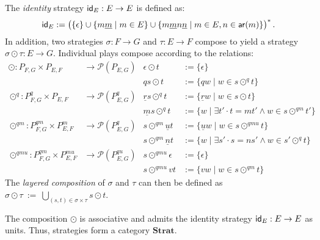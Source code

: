 \begin{definition} \label{def:lcomp} %
  The \emph{identity} strategy $ \mathsf{id} _E : E \rightarrow E$
  is defined as:
  \[
     \mathsf{id} _E :=
    \bigl(
      \{\epsilon\} \cup
      \{ m \underline{m} \mid m \in E \} \cup
      \{ m \underline{m} n \underline{n} \mid m \in E, n \in  \mathsf{ar} (m) \}
    \bigr)^*
    \,.
  \]
  In addition, two strategies
  $\sigma : F \rightarrow G$ and
  $\tau : E \rightarrow F$
  compose to yield a strategy
  $\sigma \odot \tau : E \rightarrow G$.
  Individual plays compose
  according to the relations:
  \begin{align*}
    {\odot} : P_{F,G} \times P_{E,F}
    &\rightarrow \mathcal{P}(P_{E,G}) &
    \epsilon \odot t &:= \{ \epsilon \} \\&&
    qs \odot t &:= \{ qw \mid w \in s \odot^q t \}
    \\
    {\odot}^q : P_{F,G}^q \times P_{E,F}
    &\rightarrow \mathcal{P}(P_{E,G}^q) &
    \underline{r} s \odot^q t &:=
    \{ \underline{r} w \mid w \in s \odot t \} \\&&
    \underline{m} s \odot^q t &:=
    \{ w \mid \exists t' \cdot t = mt' \wedge w \in s \odot^{qm} t' \}
    \\
    {\odot}^{qm} : P_{F,G}^{qm} \times P_{E,F}^m
    &\rightarrow \mathcal{P}(P_{E,G}^q) &
    s \odot^{qm} \underline{u} t &:=
    \{ \underline{u} w \mid w \in s \odot^{qmu} t \} \\&&
    s \odot^{qm} \underline{n} t &:=
    \{ w \mid \exists s' \cdot s = ns' \wedge w \in s' \odot^q t \}
    \\
    {\odot}^{qmu} : P_{F,G}^{qm} \times P_{E,F}^{mu}
    &\rightarrow \mathcal{P}(P_{E,G}^{qu}) &
    s \odot^{qmu} \epsilon &:= \{ \epsilon \} \\&&
    s \odot^{qmu} v t &:= \{ v w \mid w \in s \odot^{qm} t \}
  \end{align*}
  The \emph{layered composition} of $\sigma$ and $\tau$ can then be defined as
  $
  \sigma \odot \tau \: := \:
  \bigcup_{(s,t) \in \sigma \times \tau}
  s \odot t
  $.
\end{definition}

\begin{theorem}
  \label{thm:strat:comp}
  The composition $\odot$ is associative
  and admits the identity strategy $ \mathsf{id} _E : E \rightarrow E$ as units.
  Thus,
  strategies form a category $\mathbf{Strat}$.
\end{theorem}

